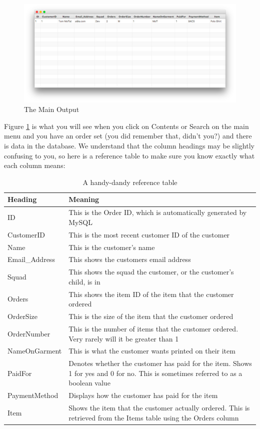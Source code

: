 \documentclass[11pt]{report}
\begin{document}
	\begin{figure}[H]
		\centering
		\includegraphics[width=\textwidth]{OutputTable}
		\caption{The Main Output}
		\label{ot}
	\end{figure}
	Figure \ref{ot} is what you will see when you click on Contents or Search on the main menu and you have an order set (you did remember that, didn't you?) and there is data in the database. We understand that the column headings may be slightly confusing to you, so here is a reference table to make sure you know exactly what each column means:
	\begin{table}[H]
	\caption{A handy-dandy reference table}
	\begin{tabular}{|p{0.2\linewidth}|p{0.8\linewidth}|}
		\hline
		Heading & Meaning \\
		\hline
		ID & This is the Order ID, which is automatically generated by MySQL \\
		CustomerID & This is the most recent customer ID of the customer \\
		Name & This is the customer's name \\
		Email\_Address & This shows the customers email address	\\
		Squad & This shows the squad the customer, or the customer's child, is in \\
		Orders & This shows the item ID of the item that the customer ordered \\
		OrderSize & This is the size of the item that the customer ordered \\
		OrderNumber & This is the number of items that the customer ordered. Very rarely will it be greater than 1 \\
		NameOnGarment & This is what the customer wants printed on their item \\
		PaidFor & Denotes whether the customer has paid for the item. Shows 1 for yes and 0 for no. This is sometimes referred to as a boolean value \\
		PaymentMethod & Displays how the customer has paid for the item \\
		Item & Shows the item that the customer actually ordered. This is retrieved from the Items table using the Orders column \\
		\hline
		\end{tabular}
	\end{table}
\end{document}
